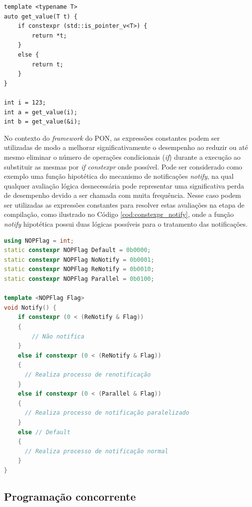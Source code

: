 \begin{lstlisting}[caption = {Aplicação de função \textit{constexpr}}, float=htb,
  source = {Autoria própria},
  label = {cod:constexpr_template}]
template <typename T>
auto get_value(T t) {
    if constexpr (std::is_pointer_v<T>) {
        return *t;
    }
    else {
        return t;
    }
}

int i = 123;
int a = get_value(i);
int b = get_value(&i);
\end{lstlisting}

No contexto do \textit{framework} do PON, as expressões constantes podem ser
utilizadas de modo a melhorar significativamente o desempenho ao reduzir ou até
mesmo eliminar o número de operações condicionais (\textit{if}) durante a
execução ao substituir as mesmas por \textit{if constexpr} onde possível. Pode
ser considerado como exemplo uma função hipotética do mecanismo de notificações
\textit{notify}, na qual qualquer avaliação lógica desnecessária pode
representar uma significativa perda de desempenho devido a ser chamada com
muita frequência. Nesse caso podem ser utilizadas as expressões constantes para
resolver estas avaliações na etapa de compilação, como ilustrado no Código
\ref{cod:constexpr_notify}, onde a função \textit{notify} hipotética possui duas
lógicas possíveis para o tratamento das notificações.

\begin{lstlisting}[language=C++,
  caption = {Método \textit{Notify} da classe \textit{Observable} no \textit{Framework} PON C++ 4.0},
  source = {Autoria própria}, float=htb,
  label = {cod:constexpr_notify}]
using NOPFlag = int;
static constexpr NOPFlag Default = 0b0000;
static constexpr NOPFlag NoNotify = 0b0001;
static constexpr NOPFlag ReNotify = 0b0010;
static constexpr NOPFlag Parallel = 0b0100;

template <NOPFlag Flag>
void Notify() {
    if constexpr (0 < (ReNotify & Flag))
    {
        // Não notifica
    }
    else if constexpr (0 < (ReNotify & Flag))
    {
      // Realiza processo de renotificação
    }
    else if constexpr (0 < (Parallel & Flag))
    {
      // Realiza processo de notificação paralelizado
    }
    else // Default
    {
      // Realiza processo de notificação normal
    }
}
\end{lstlisting}

\subsection{Programação concorrente}

